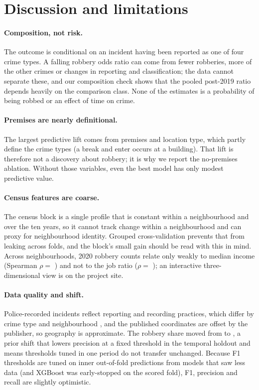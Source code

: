 \section{Discussion and limitations}
\paragraph{Composition, not risk.} The outcome is conditional on an incident having been reported as one of four crime types. A falling robbery odds ratio can come from fewer robberies, more of the other crimes or changes in reporting and classification; the data cannot separate these, and our composition check shows that the pooled post-2019 ratio depends heavily on the comparison class. None of the estimates is a probability of being robbed or an effect of time on crime.

\paragraph{Premises are nearly definitional.} The largest predictive lift comes from premises and location type, which partly define the crime types (a break and enter occurs at a building). That lift is therefore not a discovery about robbery; it is why we report the no-premises ablation. Without those variables, even the best model has only modest predictive value.

\paragraph{Census features are coarse.} The census block is a single profile that is constant within a neighbourhood and over the ten years, so it cannot track change within a neighbourhood and can proxy for neighbourhood identity. Grouped cross-validation prevents that from leaking across folds, and the block's small gain should be read with this in mind. Across neighbourhoods, 2020 robbery counts relate only weakly to median income (Spearman $\rho =$ ) and not to the job ratio ($\rho =$ ); an interactive three-dimensional view is on the project site.

\paragraph{Data quality and shift.} Police-recorded incidents reflect reporting and recording practices, which differ by crime type and neighbourhood \citep{skogan1975dark}, and the published coordinates are offset by the publisher, so geography is approximate. The robbery share moved from  to , a prior shift that lowers precision at a fixed threshold in the temporal holdout and means thresholds tuned in one period do not transfer unchanged. Because F1 thresholds are tuned on inner out-of-fold predictions from models that saw less data (and XGBoost was early-stopped on the scored fold), F1, precision and recall are slightly optimistic.

